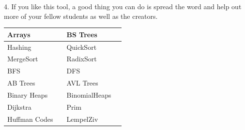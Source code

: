 \documentclass[12pt]{article}
\begin{document}
    4. If you like this tool, a good thing you can do is spread the word and help out more of your fellow students as well as the creators.
    \vspace{20px}
    \begin{center}
        \begin{tabular}{|P{2.5cm}|P{1cm}|P{2.5cm}|P{1cm}|}
            \hline
            Arrays & %
            & BS Trees & %
            \\ \hline
            Hashing & %
            & QuickSort & %
            \\ \hline
            MergeSort & %
            & RadixSort & %
            \\ \hline
            BFS & %
            & DFS & %
            \\ \hline
            AB Trees & %
            & AVL Trees & %
            \\ \hline
            Binary Heaps & %
            & BinomialHeaps & %
            \\ \hline
            Dijkstra & %
            & Prim & %
            \\ \hline
            Huffman Codes & %
            & LempelZiv &  %
            \\ \hline
        \end{tabular}
    \end{center}
\end{document}
